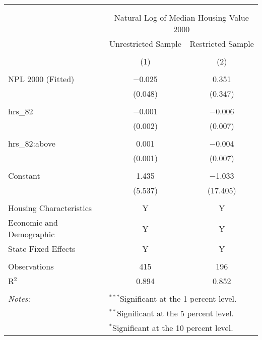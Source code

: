 
\begin{table}[!htbp] \centering 
  \caption{} 
  \label{} 
\begin{tabular}{@{\extracolsep{5pt}}lcc} 
\\[-1.8ex]\hline 
\hline \\[-1.8ex] 
\\[-1.8ex] & \multicolumn{2}{c}{Natural Log of Median Housing Value 2000} \\ 
 & Unrestricted Sample & Restricted Sample \\ 
\\[-1.8ex] & (1) & (2)\\ 
\hline \\[-1.8ex] 
 NPL 2000 (Fitted) & $-$0.025 & 0.351 \\ 
  & (0.048) & (0.347) \\ 
  & & \\ 
 hrs\_82 & $-$0.001 & $-$0.006 \\ 
  & (0.002) & (0.007) \\ 
  & & \\ 
 hrs\_82:above & 0.001 & $-$0.004 \\ 
  & (0.001) & (0.007) \\ 
  & & \\ 
 Constant & 1.435 & $-$1.033 \\ 
  & (5.537) & (17.405) \\ 
  & & \\ 
Housing Characteristics & Y & Y \\ 
Economic and Demographic & Y & Y \\ 
State Fixed Effects & Y & Y \\ 
 &  &  \\ 
Observations & 415 & 196 \\ 
R$^{2}$ & 0.894 & 0.852 \\ 
\hline \\[-1.8ex] 
\textit{Notes:} & \multicolumn{2}{l}{$^{***}$Significant at the 1 percent level.} \\ 
 & \multicolumn{2}{l}{$^{**}$Significant at the 5 percent level.} \\ 
 & \multicolumn{2}{l}{$^{*}$Significant at the 10 percent level.} \\ 
\end{tabular} 
\end{table} 
